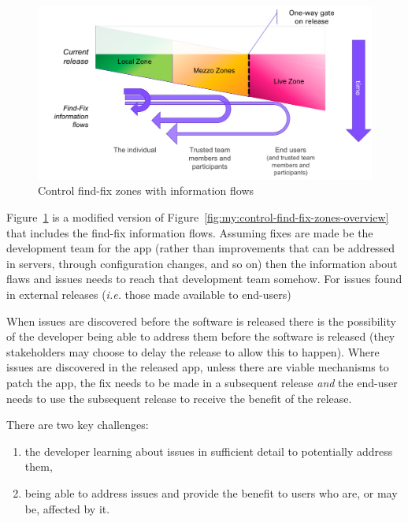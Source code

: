 \begin{figure}
    \includegraphics[width=\linewidth]{images/my/control-find-fix-zones-with-information-flows.pdf}
    \caption{Control find-fix zones with information flows}
    \label{fig:my:control-find-fix-zones-with-information-flows}
\end{figure}

Figure~\ref{fig:my:control-find-fix-zones-with-information-flows} is a modified version of Figure~\ref{fig:my:control-find-fix-zones-overview} that includes the find-fix information flows. Assuming fixes are made be the development team for the app (rather than improvements that can be addressed in servers, through configuration changes, and so on) then the information about flaws and issues needs to reach that development team somehow. For issues found in external releases (\emph{i.e.} those made available to end-users) 


When issues are discovered before the software is released there is the possibility of the developer being able to address them before the software is released (they stakeholders may choose to delay the release to allow this to happen). Where issues are discovered in the released app, unless there are viable mechanisms to patch the app, the fix needs to be made in a subsequent release \textit{and} the end-user needs to use the subsequent release to receive the benefit of the release.

There are two key challenges:
\begin{enumerate}
    \item the developer learning about issues in sufficient detail to potentially address them,
    \item being able to address issues and provide the benefit to users who are, or  may be, affected by it.
\end{enumerate}

